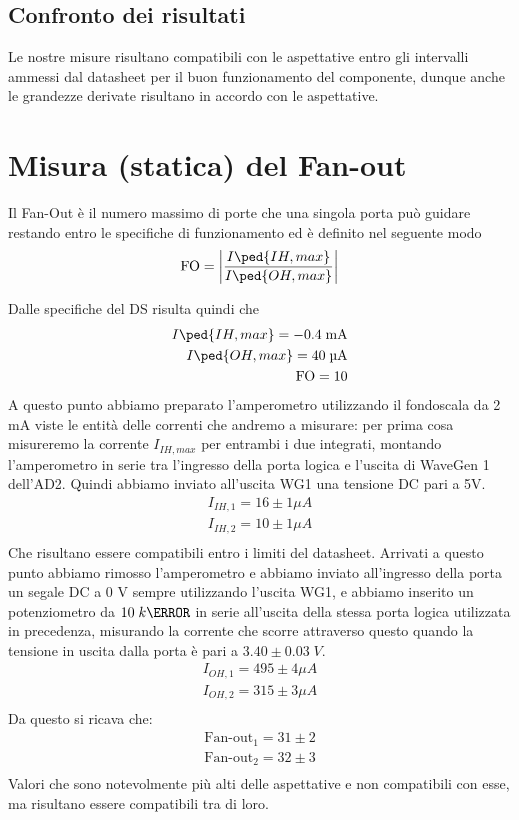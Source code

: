 \documentclass[10pt, a4paper, italian]{article}
\begin{document}
\subsection{Confronto dei risultati}
Le nostre misure risultano compatibili con le aspettative entro gli intervalli
ammessi dal datasheet per il buon funzionamento del componente, dunque anche
le grandezze derivate risultano in accordo con le aspettative.

\section{Misura (statica) del Fan-out}
Il Fan-Out è il numero massimo di porte che una singola porta può guidare
restando entro le specifiche di funzionamento ed è definito nel seguente modo
\[
\text{FO}= \abs{\frac{I\ped{IH, max}}{I\ped{OH, max}}}
\]

Dalle specifiche del DS risulta quindi che 
\begin{align*}
    I\ped{IH, max}= -0.4 \; \si{m\A} \\
    I\ped{OH, max}= 40 \; \si{\micro\A} \\
    \text{FO} = 10
\end{align*}
A questo punto abbiamo preparato l'amperometro utilizzando il fondoscala da 2 mA viste le entità delle correnti che andremo a misurare: per prima cosa misureremo la corrente $I_{IH,max}$ per entrambi i due integrati, montando l'amperometro in serie tra l'ingresso della porta logica e l'uscita di WaveGen 1 dell'AD2. Quindi abbiamo inviato all'uscita WG1 una tensione DC pari a 5V.
\begin{gather*}
    I_{IH,1}=16 \pm 1 \mu A\\
    I_{IH,2}=10 \pm 1 \mu A\\   
\end{gather*}
Che risultano essere compatibili entro i limiti del datasheet.
Arrivati a questo punto abbiamo rimosso l'amperometro e abbiamo inviato all'ingresso della porta un segale DC a 0 V sempre utilizzando l'uscita WG1, e abbiamo inserito un potenziometro da $10 \; k\ohm$ in serie all'uscita della stessa porta logica utilizzata in precedenza, misurando la corrente che scorre attraverso questo quando la tensione in uscita dalla porta è pari a $3.40 \pm 0.03 \; V$.
\begin{gather*}
    I_{OH,1}=495 \pm 4 \mu A\\
    I_{OH,2}=315 \pm 3 \mu A\\   
\end{gather*}
Da questo si ricava che:
\begin{gather*}
    \mbox{Fan-out}_1=31 \pm 2\\
    \mbox{Fan-out}_2=32 \pm 3\\
\end{gather*}
Valori che sono notevolmente più alti delle aspettative e non compatibili con esse, ma risultano essere compatibili tra di loro.
\end{document}

